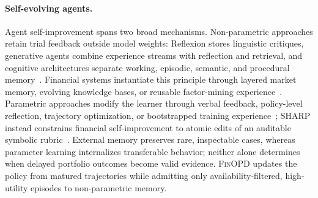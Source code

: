 \paragraph{Self-evolving agents.}
Agent self-improvement spans two broad mechanisms. Non-parametric approaches retain trial feedback outside model weights: Reflexion stores linguistic critiques, generative agents combine experience streams with reflection and retrieval, and cognitive architectures separate working, episodic, semantic, and procedural memory~\cite{reflexion2023,park2023generative,sumers2023cognitive}. Financial systems instantiate this principle through layered market memory, evolving knowledge bases, or reusable factor-mining experience~\cite{yu2023finmem,quantagent2024,factorminer2026}. Parametric approaches modify the learner through verbal feedback, policy-level reflection, trajectory optimization, or bootstrapped training experience~\cite{stephan2024rlvf,zhang2024agent,seagent2025,sirius2025,rzero2026}; SHARP instead constrains financial self-improvement to atomic edits of an auditable symbolic rubric~\cite{sharp2026}. External memory preserves rare, inspectable cases, whereas parameter learning internalizes transferable behavior; neither alone determines when delayed portfolio outcomes become valid evidence. \textsc{FinOPD} updates the policy from matured trajectories while admitting only availability-filtered, high-utility episodes to non-parametric memory.


